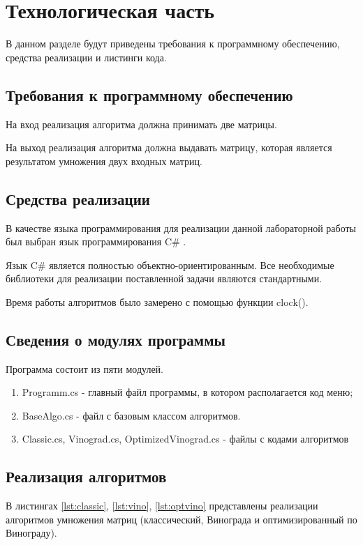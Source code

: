 \chapter{Технологическая часть}

В данном разделе будут приведены требования к программному обеспечению, средства реализации и листинги кода.

\section{Требования к программному обеспечению}

На вход реализация алгоритма должна принимать две матрицы. 

На выход реализация алгоритма должна выдавать матрицу, которая является результатом умножения двух входных матриц.

\section{Средства реализации}

В качестве языка программирования для реализации данной лабораторной работы был выбран язык программирования C\# \cite{sharplang}. 

Язык C\# является полностью объектно-ориентированным. 
Все необходимые библиотеки для реализации поставленной задачи являются стандартными.

Время работы алгоритмов было замерено с помощью функции clock().

\section{Сведения о модулях программы}
Программа состоит из пяти модулей.
\begin{enumerate}
	\item Programm.cs - главный файл программы, в котором располагается код меню;
	\item BaseAlgo.cs - файл с базовым классом алгоритмов.
	\item Classic.cs, Vinograd.cs, OptimizedVinograd.cs - файлы с кодами алгоритмов
\end{enumerate}


\section{Реализация алгоритмов}
В листингах \ref{lst:classic}, \ref{lst:vino}, \ref{lst:optvino} представлены реализации алгоритмов умножения матриц (классический, Винограда и оптимизированный по Винограду).

